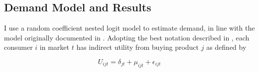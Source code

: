 \documentclass{article}
\begin{document}
 	 
 	 	 
	\subsection{Demand Model and Results}
	\label{sec:Analysis_Demand}
	I use a random coefficient nested logit model to estimate demand, in line with the model originally documented in \citet{berry_automobile_1995}. Adopting the best notation described in \citet{conlon_best_2020}, each consumer $i$ in market $t$ has indirect utility from buying product $j$ as defined by 
	
	\[U_{ijt} = \delta_{jt} + \mu_{ijt} + \epsilon_{ijt}\]
	
\end{document}

